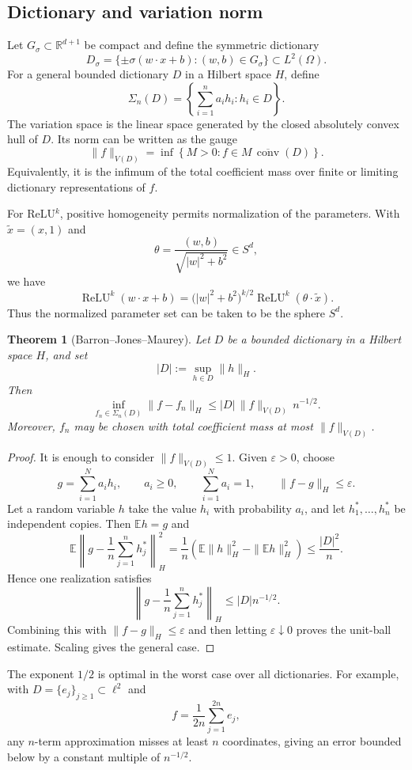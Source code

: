 \documentclass[11pt,a4paper]{article}
\newcommand{\R}{\mathbb{R}}
\newcommand{\ReLU}{\operatorname{ReLU}}
\theoremstyle{definition}
\theoremstyle{plain}
\newtheorem{theorem}{Theorem}[section]
\theoremstyle{remark}
\theoremstyle{plain}
\begin{document}
\subsection{Dictionary and variation norm}
Let $G_\sigma\subset\R^{d+1}$ be compact and define the symmetric dictionary
\[
  D_\sigma
  =\{\pm\sigma(w\cdot x+b):(w,b)\in G_\sigma\}
  \subset L^2(\Omega).
\]
For a general bounded dictionary $D$ in a Hilbert space $H$, define
\[
  \Sigma_n(D)=\left\{\sum_{i=1}^na_ih_i:h_i\in D\right\}.
\]
The variation space is the linear space generated by the closed absolutely convex hull of $D$. Its norm can be written as the gauge
\[
  \|f\|_{V(D)}
  =\inf\left\{M>0:f\in M\,\overline{\operatorname{conv}}(D)\right\}.
\]
Equivalently, it is the infimum of the total coefficient mass over finite or limiting dictionary representations of $f$.

For ReLU$^k$, positive homogeneity permits normalization of the parameters. With $\widetilde x=(x,1)$ and
\[
  \theta=\frac{(w,b)}{\sqrt{|w|^2+b^2}}\in S^d,
\]
we have
\[
  \ReLU^k(w\cdot x+b)
  =\bigl(|w|^2+b^2\bigr)^{k/2}
  \ReLU^k(\theta\cdot\widetilde x).
\]
Thus the normalized parameter set can be taken to be the sphere $S^d$.

\begin{theorem}[Barron--Jones--Maurey]
Let $D$ be a bounded dictionary in a Hilbert space $H$, and set
\[
  |D|:=\sup_{h\in D}\|h\|_H.
\]
Then
\[
  \inf_{f_n\in\Sigma_n(D)}\|f-f_n\|_H
  \le |D|\,\|f\|_{V(D)}\,n^{-1/2}.
\]
Moreover, $f_n$ may be chosen with total coefficient mass at most $\|f\|_{V(D)}$.
\end{theorem}

\begin{proof}
It is enough to consider $\|f\|_{V(D)}\le1$. Given $\varepsilon>0$, choose
\[
  g=\sum_{i=1}^Na_ih_i,
  \qquad
  a_i\ge0,
  \qquad
  \sum_{i=1}^Na_i=1,
  \qquad
  \|f-g\|_H\le\varepsilon.
\]
Let a random variable $h$ take the value $h_i$ with probability $a_i$, and let $h_1^*,\ldots,h_n^*$ be independent copies. Then $\mathbb Eh=g$ and
\[
  \mathbb E\left\|g-\frac1n\sum_{j=1}^nh_j^*\right\|_H^2
  =\frac1n\left(\mathbb E\|h\|_H^2-\|\mathbb Eh\|_H^2\right)
  \le\frac{|D|^2}{n}.
\]
Hence one realization satisfies
\[
  \left\|g-\frac1n\sum_{j=1}^nh_j^*\right\|_H
  \le |D|n^{-1/2}.
\]
Combining this with $\|f-g\|_H\le\varepsilon$ and then letting $\varepsilon\downarrow0$ proves the unit-ball estimate. Scaling gives the general case.
\end{proof}

The exponent $1/2$ is optimal in the worst case over all dictionaries. For example, with $D=\{e_j\}_{j\ge1}\subset\ell^2$ and
\[
  f=\frac1{2n}\sum_{j=1}^{2n}e_j,
\]
any $n$-term approximation misses at least $n$ coordinates, giving an error bounded below by a constant multiple of $n^{-1/2}$.
\end{document}
